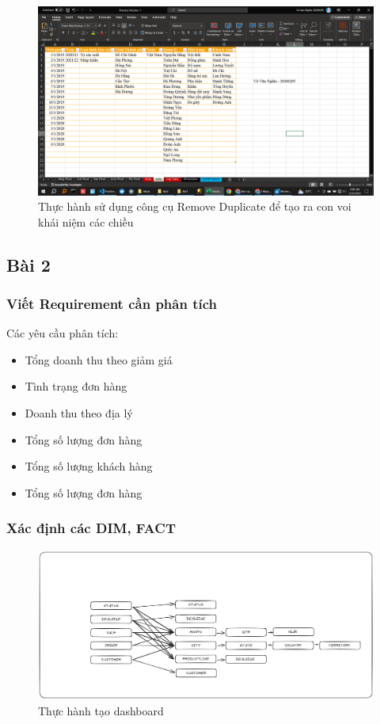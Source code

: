 \documentclass{article}
\begin{document}
\begin{itemize}
\begin{figure}[H]
\centering
\includegraphics[scale = 0.15]{Bai1/ThucHanh/VOI.png}
\caption{Thực hành sử dụng công cụ Remove Duplicate để tạo ra con voi khái niệm các chiều}
\end{figure}

\end{itemize}

\subsection{Bài 2}

\subsubsection{Viết Requirement cần phân tích}
Các yêu cầu phân tích:

\begin{itemize}
\item Tổng doanh thu theo giảm giá
\item Tình trạng đơn hàng
\item Doanh thu theo địa lý
\item Tổng số lượng đơn hàng
\item Tổng số lượng khách hàng
\item Tổng số lượng đơn hàng
\end{itemize}

\subsubsection{Xác định các DIM, FACT}

\begin{figure}[H]
\centering
\includegraphics[scale = 0.15]{Bai2/ThucHanh/DIM-FACT.png}
\caption{Thực hành tạo dashboard}
\end{figure}
\end{document}

